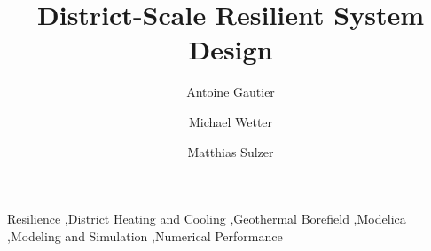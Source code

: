 \begin{frontmatter}



\title{District-Scale Resilient System Design}

%
\author[lbl]{Antoine Gautier}%
\author[lbl]{Michael Wetter}%
\author[empa]{Matthias Sulzer}%
%


\begin{abstract}

\end{abstract}




\begin{keyword}
Resilience \sep District Heating and Cooling \sep Geothermal Borefield \sep Modelica \sep Modeling and Simulation \sep Numerical Performance
\end{keyword}

\end{frontmatter}